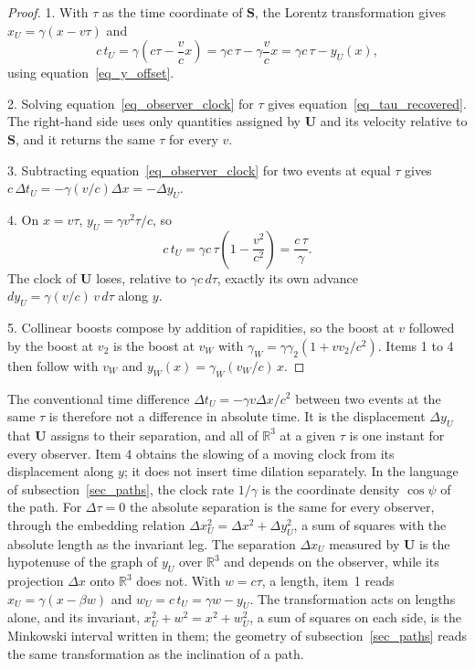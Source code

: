\documentclass{iopjournal}
\begin{document}
\begin{proof}
1. With $\tau$ as the time coordinate of $\mathbf{S}$, the Lorentz transformation gives $x_U=\gamma(x-v\tau)$ and
\begin{equation}
    c\,t_U=\gamma\left(c\tau-\frac{v}{c}x\right)=\gamma c\,\tau-\gamma\frac{v}{c}x=\gamma c\,\tau-y_U(x),
\end{equation}
using equation~\eqref{eq_y_offset}.

2. Solving equation~\eqref{eq_observer_clock} for $\tau$ gives equation~\eqref{eq_tau_recovered}. The right-hand side uses only quantities assigned by $\mathbf{U}$ and its velocity relative to $\mathbf{S}$, and it returns the same $\tau$ for every $v$.

3. Subtracting equation~\eqref{eq_observer_clock} for two events at equal $\tau$ gives $c\,\Delta t_U=-\gamma(v/c)\Delta x=-\Delta y_U$.

4. On $x=v\tau$, $y_U=\gamma v^2\tau/c$, so
\begin{equation}
    c\,t_U=\gamma c\,\tau\left(1-\frac{v^2}{c^2}\right)=\frac{c\,\tau}{\gamma}.
\end{equation}
The clock of $\mathbf{U}$ loses, relative to $\gamma c\,d\tau$, exactly its own advance $dy_U=\gamma(v/c)\,v\,d\tau$ along $y$.

5. Collinear boosts compose by addition of rapidities, so the boost at $v$ followed by the boost at $v_2$ is the boost at $v_W$ with $\gamma_W=\gamma\gamma_2(1+vv_2/c^2)$. Items 1 to 4 then follow with $v_W$ and $y_W(x)=\gamma_W(v_W/c)\,x$.
\end{proof}

The conventional time difference $\Delta t_U=-\gamma v\Delta x/c^2$ between two events at the same $\tau$ is therefore not a difference in absolute time. It is the displacement $\Delta y_U$ that $\mathbf{U}$ assigns to their separation, and all of $\mathbb{R}^3$ at a given $\tau$ is one instant for every observer. Item 4 obtains the slowing of a moving clock from its displacement along $y$; it does not insert time dilation separately. In the language of subsection~\ref{sec_paths}, the clock rate $1/\gamma$ is the coordinate density $\cos\psi$ of the path. For $\Delta\tau=0$ the absolute separation is the same for every observer, through the embedding relation $\Delta x_U^2=\Delta x^2+\Delta y_U^2$, a sum of squares with the absolute length as the invariant leg. The separation $\Delta x_U$ measured by $\mathbf{U}$ is the hypotenuse of the graph of $y_U$ over $\mathbb{R}^3$ and depends on the observer, while its projection $\Delta x$ onto $\mathbb{R}^3$ does not. With $w=c\tau$, a length, item~1 reads $x_U=\gamma\left(x-\beta w\right)$ and $w_U=c\,t_U=\gamma w-y_U$. The transformation acts on lengths alone, and its invariant, $x_U^2+w^2=x^2+w_U^2$, a sum of squares on each side, is the Minkowski interval written in them; the geometry of subsection~\ref{sec_paths} reads the same transformation as the inclination of a path.
\end{document}
